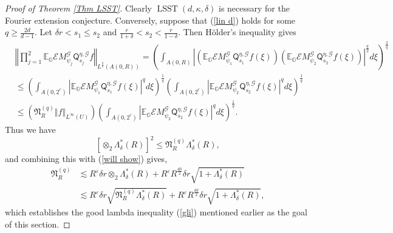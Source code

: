 \documentclass{amsart}%
\theoremstyle{plain}
\numberwithin{equation}{section}
\begin{document}
\begin{proof}
[Proof of Theorem \ref{Thm LSST}]Clearly $\operatorname*{LSST}\left(
d,\kappa,\delta\right)  $ is necessary for the Fourier extension conjecture.
Conversely, suppose that (\ref{lin d}) holds for some $q\geq\frac{2d}{d-1}$.
Let $\delta r<s_{1}\leq s_{2}$ and $\frac{r}{1+\delta}<s_{2}<\frac{r}%
{1-\delta}$. Then H\"{o}lder's inequality gives%
\begin{align}
& \left\Vert \prod_{j=1}^{2}\mathbb{E}_{\mathbb{G}}\mathcal{E}M_{\psi_{j}%
}^{\mathcal{G}}\mathsf{Q}_{s_{j}}^{\eta,\mathcal{G}}f\right\Vert _{L^{\frac
{q}{2}}\left(  A\left(  0,R\right)  \right)  }=\left(  \int_{A\left(
0,R\right)  }\left\vert \left(  \mathbb{E}_{\mathbb{G}}\mathcal{E}M_{\psi_{1}%
}^{\mathcal{G}}\mathsf{Q}_{s_{1}}^{\eta,\mathcal{G}}f\left(  \xi\right)
\right)  \left(  \mathbb{E}_{\mathbb{G}}\mathcal{E}M_{\psi_{2}}^{\mathcal{G}%
}\mathsf{Q}_{s_{2}}^{\eta,\mathcal{G}}f\left(  \xi\right)  \right)
\right\vert ^{\frac{q}{2}}d\xi\right)  ^{\frac{2}{q}}\label{bilin to lin}\\
& \leq\left(  \int_{A\left(  0,2^{r}\right)  }\left\vert \mathbb{E}%
_{\mathbb{G}}\mathcal{E}M_{\psi_{1}}^{\mathcal{G}}\mathsf{Q}_{s_{1}}%
^{\eta,\mathcal{G}}f\left(  \xi\right)  \right\vert ^{q}d\xi\right)
^{\frac{1}{q}}\left(  \int_{A\left(  0,2^{r}\right)  }\left\vert
\mathbb{E}_{\mathbb{G}}\mathcal{E}M_{\psi_{2}}^{\mathcal{G}}\mathsf{Q}_{s_{2}%
}^{\eta,\mathcal{G}}f\left(  \xi\right)  \right\vert ^{q}d\xi\right)
^{\frac{1}{q}}\nonumber\\
& \leq\left(  \mathfrak{N}_{R}^{\left(  q\right)  }\left\Vert f\right\Vert
_{L^{\infty}\left(  U\right)  }\right)  \left(  \int_{A\left(  0,2^{r}\right)
}\left\vert \mathbb{E}_{\mathbb{G}}\mathcal{E}M_{\psi_{2}}^{\mathcal{G}%
}\mathsf{Q}_{s_{2}}^{\eta,\mathcal{G}}f\left(  \xi\right)  \right\vert
^{q}d\xi\right)  ^{\frac{1}{q}}.\nonumber
\end{align}
Thus we have%
\[
\left[  \otimes_{2}\Lambda_{\delta}^{\ast}\left(  R\right)  \right]  ^{2}%
\leq\mathfrak{N}_{R}^{\left(  q\right)  }\Lambda_{\delta}^{\ast}\left(
R\right)  ,
\]
and combining this with (\ref{will show}) gives,%
\begin{align*}
\mathfrak{N}_{R}^{\left(  q\right)  }  & \lesssim R^{\varepsilon}\delta
r\otimes_{2}\Lambda_{\delta}^{\ast}\left(  R\right)  +R^{\varepsilon}%
R^{\frac{d\delta}{2}}\delta r\sqrt{1+\Lambda_{\delta}^{\ast}\left(  R\right)
}\\
& \lesssim R^{\varepsilon}\delta r\sqrt{\mathfrak{N}_{R}^{\left(  q\right)
}\Lambda_{\delta}^{\ast}\left(  R\right)  }+R^{\varepsilon}R^{\frac{d\delta
}{2}}\delta r\sqrt{1+\Lambda_{\delta}^{\ast}\left(  R\right)  },
\end{align*}
which establishes the good lambda inequality (\ref{gli}) mentioned earlier as
the goal of this section.


\end{proof}
\end{document}
